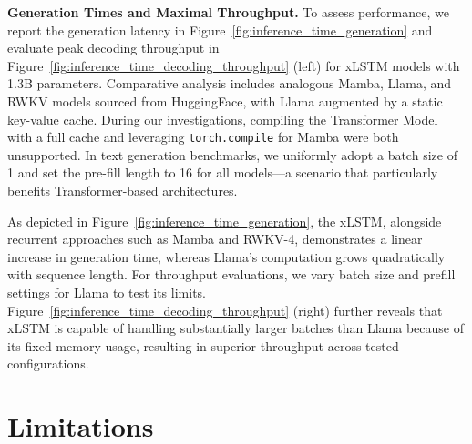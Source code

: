 \textbf{Generation Times and Maximal Throughput.} To assess performance, we report the generation latency in Figure~\ref{fig:inference_time_generation} and evaluate peak decoding throughput in Figure~\ref{fig:inference_time_decoding_throughput} (left) for xLSTM models with 1.3B parameters. Comparative analysis includes analogous Mamba, Llama, and RWKV models sourced from HuggingFace, with Llama augmented by a static key-value cache. During our investigations, compiling the Transformer Model with a full cache and leveraging \texttt{torch.compile} for Mamba were both unsupported. In text generation benchmarks, we uniformly adopt a batch size of 1 and set the pre-fill length to 16 for all models—a scenario that particularly benefits Transformer-based architectures. 

As depicted in Figure~\ref{fig:inference_time_generation}, the xLSTM, alongside recurrent approaches such as Mamba and RWKV-4, demonstrates a linear increase in generation time, whereas Llama’s computation grows quadratically with sequence length. For throughput evaluations, we vary batch size and prefill settings for Llama to test its limits. Figure~\ref{fig:inference_time_decoding_throughput} (right) further reveals that xLSTM is capable of handling substantially larger batches than Llama because of its fixed memory usage, resulting in superior throughput across tested configurations.

\section{Limitations}

